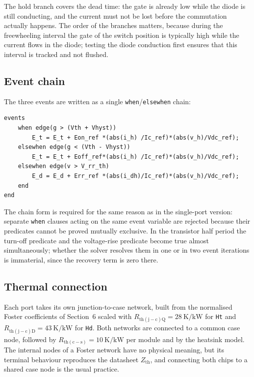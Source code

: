 \documentclass[11pt,a4paper]{article}
\newcommand{\code}[1]{\texttt{\small #1}}
\begin{document}
The hold branch covers the dead time: the gate is already low while the diode is
still conducting, and the current must not be lost before the commutation
actually happens. The order of the branches matters, because during the
freewheeling interval the gate of the switch position is typically high while
the current flows in the diode; testing the diode conduction first ensures that
this interval is tracked and not flushed.

\subsection{Event chain}

The three events are written as a single \code{when}/\code{elsewhen} chain:
\begin{lstlisting}
events
    when edge(g > (Vth + Vhyst))
        E_t = E_t + Eon_ref *(abs(i_h) /Ic_ref)*(abs(v_h)/Vdc_ref);
    elsewhen edge(g < (Vth - Vhyst))
        E_t = E_t + Eoff_ref*(abs(i_h) /Ic_ref)*(abs(v_h)/Vdc_ref);
    elsewhen edge(v > V_rr_th)
        E_d = E_d + Err_ref *(abs(i_dh)/Ic_ref)*(abs(v_h)/Vdc_ref);
    end
end
\end{lstlisting}
The chain form is required for the same reason as in the single-port version:
separate \code{when} clauses acting on the same event variable are rejected
because their predicates cannot be proved mutually exclusive. In the transistor
half period the turn-off predicate and the voltage-rise predicate become true
almost simultaneously; whether the solver resolves them in one or in two event
iterations is immaterial, since the recovery term is zero there.

\subsection{Thermal connection}

Each port takes its own junction-to-case network, built from the normalised
Foster coefficients of Section~6 scaled with
$R_\mathrm{th(j-c)Q} = \SI{28}{\kelvin\per\kilo\watt}$ for \code{Ht} and
$R_\mathrm{th(j-c)D} = \SI{43}{\kelvin\per\kilo\watt}$ for \code{Hd}. Both
networks are connected to a common case node, followed by
$R_\mathrm{th(c-s)} = \SI{10}{\kelvin\per\kilo\watt}$ per module and by the
heatsink model. The internal nodes of a Foster network have no physical
meaning, but its terminal behaviour reproduces the datasheet $Z_\mathrm{th}$,
and connecting both chips to a shared case node is the usual practice.
\end{document}

